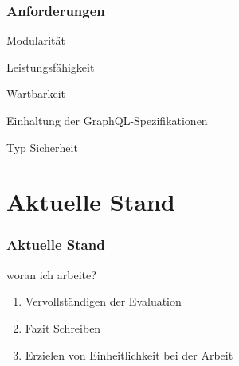 \begin{frame}
    \frametitle{Anforderungen}

    \begin{alertblock}{Modularität}
    \end{alertblock}
    \begin{alertblock}{Leistungsfähigkeit}
    \end{alertblock}
    \begin{alertblock}{Wartbarkeit}
    \end{alertblock}
    \begin{alertblock}{Einhaltung der GraphQL-Spezifikationen}
    \end{alertblock}
    \begin{alertblock}{Typ Sicherheit}
    \end{alertblock}

\end{frame}


\section{Aktuelle Stand}

\begin{frame}{}
    \frametitle{Aktuelle Stand}

    \footnotesize

    \begin{alertblock}{woran ich arbeite?}
        \begin{enumerate}
            \item Vervollständigen der Evaluation
            \item Fazit Schreiben
            \item Erzielen von Einheitlichkeit bei der Arbeit
        \end{enumerate}
    \end{alertblock}

\end{frame}